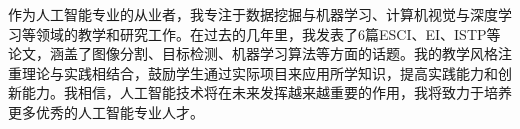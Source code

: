 \cvsection{}


\begin{cvparagraph}
作为人工智能专业的从业者，我专注于数据挖掘与机器学习、计算机视觉与深度学习等领域的教学和研究工作。在过去的几年里，我发表了6篇ESCI、EI、ISTP等论文，涵盖了图像分割、目标检测、机器学习算法等方面的话题。我的教学风格注重理论与实践相结合，鼓励学生通过实际项目来应用所学知识，提高实践能力和创新能力。我相信，人工智能技术将在未来发挥越来越重要的作用，我将致力于培养更多优秀的人工智能专业人才。
\end{cvparagraph}
